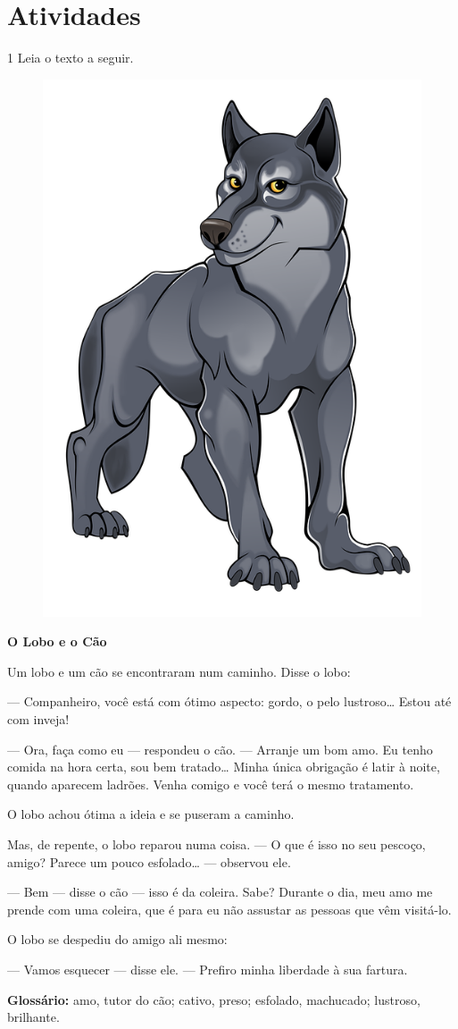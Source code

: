 \section*{Atividades}

\num{1} Leia o texto a seguir.


\begin{myquote}
\begin{figure}
\includegraphics[width=.3\textwidth]{media/image22.png}
\end{figure}

\textbf{O Lobo e o Cão}

Um lobo e um cão se encontraram num caminho. Disse o lobo:

--- Companheiro, você está com ótimo aspecto: gordo, o pelo
lustroso\ldots{} Estou até com inveja!

--- Ora, faça como eu --- respondeu o cão. --- Arranje um bom amo. Eu
tenho comida na hora certa, sou bem tratado\ldots{} Minha única
obrigação é latir à noite, quando aparecem ladrões. Venha comigo e você
terá o mesmo tratamento.

O lobo achou ótima a ideia e se puseram a caminho.

Mas, de repente, o lobo reparou numa coisa. --- O que é isso no seu
pescoço, amigo? Parece um pouco esfolado\ldots{} --- observou ele.

--- Bem --- disse o cão --- isso é da coleira. Sabe? Durante o dia,
meu amo me prende com uma coleira, que é para eu não assustar as pessoas
que vêm visitá-lo.

O lobo se despediu do amigo ali mesmo:

--- Vamos esquecer --- disse ele. --- Prefiro minha liberdade à sua
fartura.


\begin{small}
\textbf{Glossário:} amo, tutor do cão; cativo, preso; esfolado, machucado; lustroso, brilhante.
\end{small}
\end{myquote}

